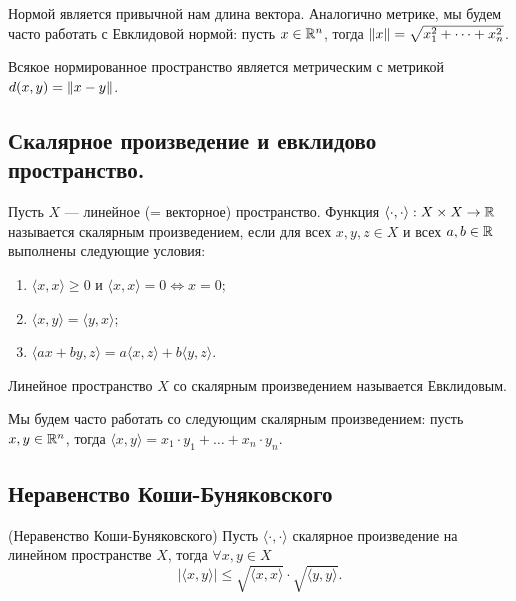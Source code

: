 \documentclass[a4paper]{article}
\theoremstyle{named}
\begin{document}
    Нормой является привычной нам длина вектора. Аналогично метрике, мы будем часто работать с Евклидовой нормой: пусть $x \in \mathbb{R}^n$, тогда $\left\lVert x\right\rVert = \sqrt{x_1^2 + \dots + x_n^2}$.

    Всякое нормированное пространство является метрическим с метрикой $d(x, y) = \left\lVert x - y\right\rVert$.

    \subsection{Скалярное произведение и евклидово пространство.}

    \begin{definition*}
        Пусть $X$ --- линейное (= векторное) пространство. Функция $\langle \cdot, \cdot \rangle: X \times X \to \mathbb{R}$ называется скалярным произведением, если для всех $x, y, z \in X$ и всех $a, b \in \mathbb{R}$ выполнены следующие условия:
        \begin{enumerate}
        \item $\langle x, x \rangle \geq 0$ и $\langle x, x \rangle = 0 \iff x = 0$;
        \item $\langle x, y \rangle = \langle y, x \rangle$;
        \item $\langle ax + by, z \rangle = a \langle x, z \rangle + b \langle y, z \rangle$.
        \end{enumerate}

        Линейное пространство $X$ со скалярным произведением называется Евклидовым.
    \end{definition*}

    Мы будем часто работать со следующим скалярным произведением: пусть $x, y \in \mathbb{R}^n$, тогда $\langle x, y \rangle = x_1 \cdot y_1 + \dots + x_n \cdot y_n$.

    \subsection{Неравенство Коши-Буняковского}

    \begin{lemma*} (Неравенство Коши-Буняковского) 
        Пусть $\langle \cdot, \cdot \rangle$ скалярное произведение на линейном пространстве $X$, тогда $\forall x, y \in X$
        \begin{equation*}
            |\langle x, y \rangle| \leq \sqrt{\langle x, x \rangle} \cdot \sqrt{\langle y, y \rangle}.
        \end{equation*}
    \end{lemma*}
\end{document}
